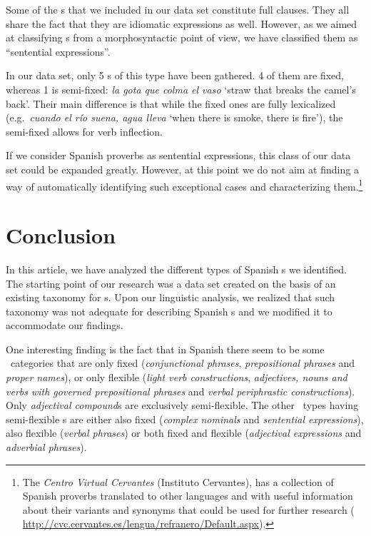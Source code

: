 \documentclass[output=paper]{langsci/langscibook}
\begin{document}
Some of the \mwe s that we included in our data set constitute full clauses.
They all share the fact that they are idiomatic expressions as well. 
However, as we aimed at classifying \mwe s from a morphosyntactic point of view, we have classified them as ``sentential expressions''.

In our data set, only 5 \mwe s of this type have been gathered.
4 of them are fixed, whereas 1 is semi-fixed: \textit{la gota que colma el vaso} `straw that breaks the camel's back'.
Their main difference is that while the fixed ones are fully lexicalized (e.g.\ \textit{cuando el río suena, agua lleva} `when there is smoke, there is fire'), the semi-fixed allows for verb inflection.

If we consider Spanish proverbs as sentential expressions, this class of our data set could be expanded greatly.
However, at this point we do not aim at finding a way of automatically identifying such exceptional cases and characterizing them.\footnote{The \textit{Centro Virtual Cervantes} (Instituto Cervantes), has a collection of Spanish proverbs translated to other languages and with useful information about their variants and synonyms that could be used for further research ( \href{http://cvc.cervantes.es/lengua/refranero/Default.aspx}{http://cvc.cervantes.es/lengua/refranero/Default.aspx}).}

\section{Conclusion}
\label{sec:conclusion}

In this article, we have analyzed the different types of Spanish \mwe s we identified.
The starting point of our research was a data set created on the basis of an existing taxonomy for \mwe s.
Upon our linguistic analysis, we realized that such taxonomy was not adequate for describing Spanish \mwe s and we modified it to accommodate our findings.

One interesting finding is the fact that in Spanish there seem to be some \mwe\ categories that are only fixed (\textit{conjunctional phrases}, \textit{prepositional phrases} and \textit{proper names}), or only flexible (\textit{light verb constructions}, \textit{adjectives, nouns and verbs with governed prepositional phrases} and \textit{verbal periphrastic constructions}).
Only \textit{adjectival compound}s are exclusively semi-flexible.
The other \mwe\ types having semi-flexible \mwe s are either also fixed (\textit{complex nominals} and \textit{sentential expressions}), also flexible (\textit{verbal phrases}) or both fixed and flexible (\textit{adjectival expressions} and \textit{adverbial phrases}).
\end{document}
